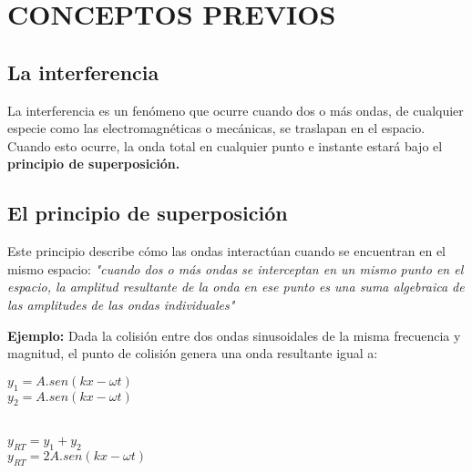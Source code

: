 \documentclass[a4paper]{article}
\begin{document}
	\pagestyle{fancy}
	\fancyhf{}
	\renewcommand{\headrulewidth}{0pt}
	\renewcommand{\footrulewidth}{0pt}
	\setlength{\footskip}{0pt}
		
	\newpage
	\thispagestyle{empty}
	\text{}
	\newpage
	
	\thispagestyle{empty}
	\setcounter{page}{0}
	\tableofcontents
	
	\newpage
	\thispagestyle{fancy}
	
	\flushbottom
	\twocolumn
		\section{CONCEPTOS PREVIOS}
			\subsection{La interferencia}
		\indent La interferencia es un fenómeno que ocurre cuando dos o más ondas, de cualquier especie como las electromagnéticas o mecánicas, se traslapan en el espacio. Cuando esto ocurre, la onda total en cualquier punto e instante estará bajo el \textbf{principio de superposición.}
		
		\subsection{El principio de superposición}
		\indent Este principio describe cómo las ondas interactúan cuando se encuentran en el mismo espacio: \textit{"cuando dos o más ondas se interceptan en un mismo punto en el espacio, la amplitud resultante de la onda en ese punto es una suma algebraica de las amplitudes de las ondas individuales"} \newline
		
		\textbf{Ejemplo:} \newline
		\indent Dada la colisión entre dos ondas sinusoidales de la misma frecuencia y magnitud, el punto de colisión genera una onda resultante igual a:
		
		\begin{center}
			${y_1} = A.sen(kx - \omega t)$ \\ 
			${y_2} = A.sen(kx - \omega t)$ \\ \
			
			${y_{RT}} = {y_1} + {y_2}$ \\
			${y_{RT}} = 2A.sen(kx - \omega t)$ \\
		\end{center}
		
\end{document}
